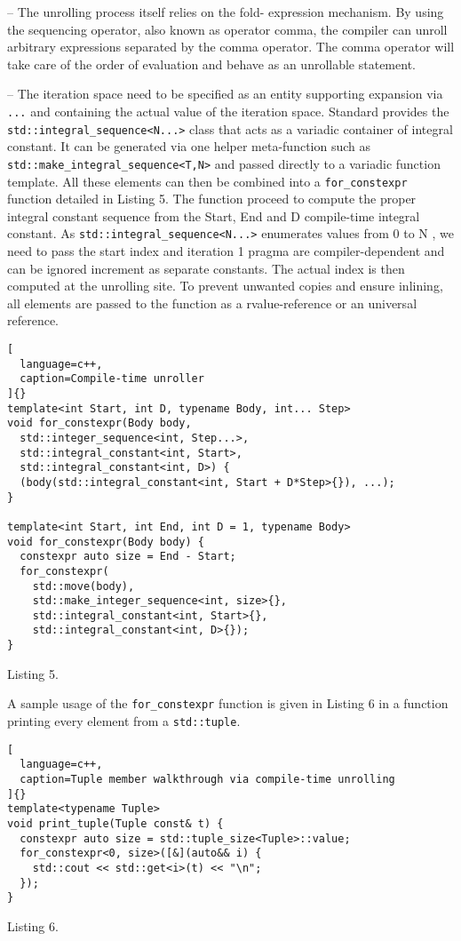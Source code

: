 \documentclass[../../main.tex]{subfiles}
\begin{document}
– The unrolling process itself relies on the fold-
expression mechanism. By using the sequencing
operator, also known as operator comma, the
compiler can unroll arbitrary expressions separated
by the comma operator. The comma operator will
take care of the order of evaluation and behave as
an unrollable statement.

– The iteration space need to be specified
as an entity supporting expansion via \lstinline{...}
and containing the actual value of the
iteration space. Standard \cpp provides the
\lstinline{std::integral_sequence<N...>} class that
acts as a variadic container of integral constant. It
can be generated via one helper meta-function such
as \lstinline{std::make_integral_sequence<T,N>}
and passed directly to a variadic function template.
All these elements can then be combined into a
\lstinline{for_constexpr} function detailed in Listing 5.
The function proceed to compute the proper
integral constant sequence from the Start,
End and D compile-time integral constant. As
\lstinline{std::integral_sequence<N...>} enumerates values
from 0 to N , we need to pass the start index and iteration
1 pragma are compiler-dependent and can be ignored
increment as separate constants. The actual index is then
computed at the unrolling site. To prevent unwanted copies
and ensure inlining, all elements are passed to the function
as a rvalue-reference or an universal reference.

\begin{lstlisting}[
  language=c++,
  caption=Compile-time unroller
]{}
template<int Start, int D, typename Body, int... Step>
void for_constexpr(Body body,
  std::integer_sequence<int, Step...>,
  std::integral_constant<int, Start>,
  std::integral_constant<int, D>) {
  (body(std::integral_constant<int, Start + D*Step>{}), ...);
}

template<int Start, int End, int D = 1, typename Body>
void for_constexpr(Body body) {
  constexpr auto size = End - Start;
  for_constexpr(
    std::move(body),
    std::make_integer_sequence<int, size>{},
    std::integral_constant<int, Start>{},
    std::integral_constant<int, D>{});
}
\end{lstlisting}
Listing 5.

A sample usage of the \lstinline{for_constexpr} function is given
in Listing 6 in a function printing every element from a
\lstinline{std::tuple}.

\begin{lstlisting}[
  language=c++,
  caption=Tuple member walkthrough via compile-time unrolling
]{}
template<typename Tuple>
void print_tuple(Tuple const& t) {
  constexpr auto size = std::tuple_size<Tuple>::value;
  for_constexpr<0, size>([&](auto&& i) {
    std::cout << std::get<i>(t) << "\n";
  });
}
\end{lstlisting}
Listing 6.
\end{document}
